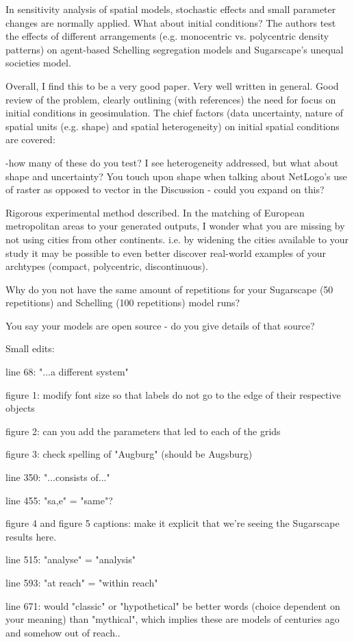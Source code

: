 \documentclass[11pt,a4paper,sans]{moderncv}        %
\begin{document}
In sensitivity analysis of spatial models, stochastic effects and small parameter changes are normally applied. What about initial conditions? The authors test the effects of different arrangements (e.g. monocentric vs. polycentric density patterns) on agent-based Schelling segregation models and Sugarscape's unequal societies model.

Overall, I find this to be a very good paper. Very well written in general. Good review of the problem, clearly outlining (with references) the need for focus on initial conditions in geosimulation. The chief factors (data uncertainty, nature of spatial units (e.g. shape) and spatial heterogeneity) on initial spatial conditions are covered:

-how many of these do you test? I see heterogeneity addressed, but what about shape and uncertainty? You touch upon shape when talking about NetLogo's use of raster as opposed to vector in the Discussion - could you expand on this?

Rigorous experimental method described. In the matching of European metropolitan areas to your generated outputs, I wonder what you are missing by not using cities from other continents. i.e. by widening the cities available to your study it may be possible to even better discover real-world examples of your archtypes (compact, polycentric, discontinuous).

Why do you not have the same amount of repetitions for your Sugarscape (50 repetitions) and Schelling (100 repetitions) model runs?

You say your models are open source - do you give details of that source?  

Small edits:

line 68: "...a different system"

figure 1: modify font size so that labels do not go to the edge of their respective objects

figure 2: can you add the parameters that led to each of the grids

figure 3: check spelling of "Augburg" (should be Augsburg)

line 350: "...consists of..."

line 455: "sa,e" = "same"?

figure 4 and figure 5 captions: make it explicit that we're seeing the Sugarscape results here.

line 515: "analyse" = "analysis"

line 593: "at reach" = "within reach"

line 671: would "classic" or "hypothetical" be better words (choice dependent on your meaning) than "mythical", which implies these are models of centuries ago and somehow out of reach..









\justify




\makeletterclosing
\end{document}

